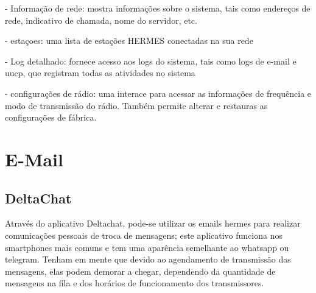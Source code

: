 \documentclass[11pt,a4paper]{article}
\begin{document}

- Informação de rede: mostra informações sobre o sistema, tais como endereços de rede, indicativo de chamada, nome do servidor, etc.



- estaçoes: uma lista de estações HERMES conectadas na sua rede



- Log detalhado: fornece acesso aos logs do sistema, tais como logs de e-mail e uucp, que registram todas as atividades no sistema




- configurações de rádio: uma interace para acessar as informações de frequência e modo de transmissão do rádio. Também permite alterar e restauras as configurações de fábrica.




\section{E-Mail}

\subsection{DeltaChat}
Através do aplicativo Deltachat, pode-se utilizar os emails hermes para realizar comunicações pessoais de troca de mensagens; este aplicativo funciona nos smartphones mais comuns e tem uma aparência semelhante ao whatsapp ou telegram. Tenham em mente que devido ao agendamento de transmissão das mensagens, elas podem demorar a chegar, dependendo da quantidade de mensagens na fila e dos horários de funcionamento dos transmissores.
\end{document}
